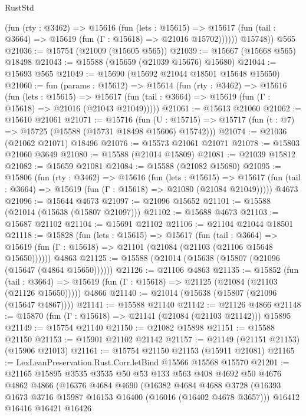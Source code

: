 \begin{lexlean}{RustStd}
\begin{coremodule}
            (fun (rty : @3462) =>
            @15616
              (fun (lets : @15615) =>
              @15617 (fun (tail : @3664) => @15619 (fun (Γ : @15618) => @21016 @15702))))))
        @15748))
    @565
@21036 := @15754 (@21009 (@15605 @565))
@21039 := @15667 (@15668 @565) @18498
@21043 := @15588 (@15659 (@21039 @15676) @15680)
@21044 := @15693 @565
@21049 := @15690 (@15692 @21044 @18501 @15648 @15650)
@21060 := fun (params : @15612) =>
  @15614
    (fun (rty : @3462) =>
    @15616
      (fun (lets : @15615) =>
      @15617 (fun (tail : @3664) => @15619 (fun (Γ : @15618) => @21016 (@21043 @21049)))))
@21061 := @15613 @21060
@21062 := @15610 @21061
@21071 := @15716
    (fun (U : @15715) => @15717 (fun (t : @7) => @15725 (@15588 (@15731 @18498 @15606) @15742)))
@21074 := @21036 (@21062 @21071) @18496
@21076 := @15573 @21061 @21071
@21078 := @15803 @21060 @3649
@21080 := @15588 (@21014 @15809)
@21081 := @21039 @15812
@21082 := @15659 @21081
@21084 := @15588 (@21082 @15680)
@21095 := @15806
    (fun (rty : @3462) =>
    @15616
      (fun (lets : @15615) =>
      @15617 (fun (tail : @3664) => @15619 (fun (Γ : @15618) => @21080 (@21084 @21049)))))
    @4673
@21096 := @15644 @4673
@21097 := @21096 @15652
@21101 := @15588 (@21014 (@15638 (@15807 @21097)))
@21102 := @15688 @4673
@21103 := @15687 @21102
@21104 := @15691 @21102
@21106 := @21104 @21044 @18501
@21118 := @15828
    (fun (lets : @15615) =>
    @15617
      (fun (tail : @3664) =>
      @15619 (fun (Γ : @15618) => @21101 (@21084 (@21103 (@21106 @15648 @15650))))))
    @4863
@21125 := @15588 (@21014 (@15638 (@15807 (@21096 (@15647 (@4864 @15650))))))
@21126 := @21106 @4863
@21135 := @15852
    (fun (tail : @3664) => @15619 (fun (Γ : @15618) => @21125 (@21084 (@21103 (@21126 @15650)))))
    @4866
@21140 := @21014 (@15638 (@15807 (@21096 (@15647 @4867))))
@21141 := @15588 @21140
@21142 := @21126 @4866
@21148 := @15870 (fun (Γ : @15618) => @21141 (@21084 (@21103 @21142))) @15895
@21149 := @15754 @21140
@21150 := @21082 @15898
@21151 := @15588 @21150
@21153 := @15901 @21102 @21142
@21157 := @21149 (@21151 @21153) (@15906 @21013)
@21161 := @15754 @21150 @21153 (@15911 @21081)
@21165 := LexLeanPreservation.Rust.Corr.letBind @15566 @15568 @15570
@21201 := @21165
    @15895
    @3535
    @3535
    @50
    @53
    @133
    @563
    @408
    @4692
    @50
    @4676
    @4862
    @4866
    (@16376
      @4684
      @4690
      (@16382
        @4684
        @4688
        @3728
        (@16393 @1673 @3716 @15987 @16153 @16400 (@16016 (@16402 @4678 @3657)))
        @16412
        @16416
        @16421
        @16426

\end{coremodule}
\end{lexlean}
